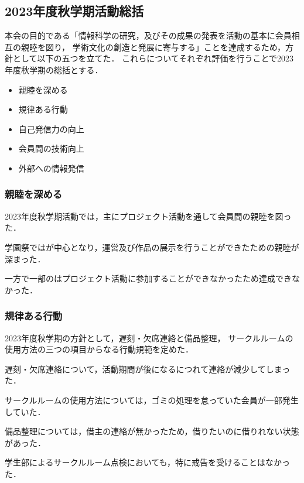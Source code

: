 \subsection*{2023年度秋学期活動総括}


本会の目的である「情報科学の研究，及びその成果の発表を活動の基本に会員相互の親睦を図り，
学術文化の創造と発展に寄与する」ことを達成するため，方針として以下の五つを立てた．
これらについてそれぞれ評価を行うことで2023年度秋学期の総括とする．

\begin{itemize}
    \item 親睦を深める
    \item 規律ある行動
    \item 自己発信力の向上
    \item 会員間の技術向上
    \item 外部への情報発信
\end{itemize}

\subsubsection*{親睦を深める}
    2023年度秋学期活動では，主にプロジェクト活動を通して会員間の親睦を図った．

    学園祭では\secondGrade{}が中心となり，運営及び作品の展示を行うことができたため\secondGrade{}の親睦が深まった．

    一方で一部の\firstGrade{}はプロジェクト活動に参加することができなかったため達成できなかった．

\subsubsection*{規律ある行動}
    2023年度秋学期の方針として，遅刻・欠席連絡と備品整理，
    サークルルームの使用方法の三つの項目からなる行動規範を定めた．

    遅刻・欠席連絡について，活動期間が後になるにつれて連絡が減少してしまった．

    サークルルームの使用方法については，ゴミの処理を怠っていた会員が一部発生していた．

    備品整理については，借主の連絡が無かったため，借りたいのに借りれない状態があった．

    学生部によるサークルルーム点検においても，特に戒告を受けることはなかった．

